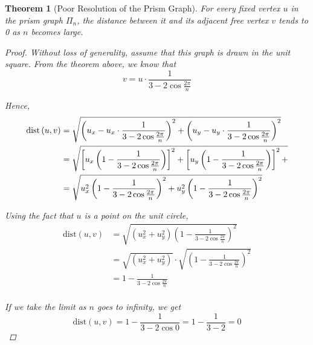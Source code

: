 \documentclass[11pt]{report}
\newcommand{\dist}[2]{\text{dist}\left({#1, #2}\right)}
\newtheorem{theorem}{Theorem}[section]
\begin{document}
\begin{theorem}[Poor Resolution of the Prism Graph]
    For every fixed vertex $u$ in the prism graph $\Pi_{n}$, the distance between it and its adjacent free vertex $v$ tends to 0 as $n$ becomes large.

    \begin{proof}
        Without loss of generality, assume that this graph is drawn in the unit square. From the theorem above, we know that
        \[ v = u \cdot \frac{1}{3 -2\cos{\frac{2\pi}{n}}} \]
        
        Hence,
        \[
        \begin{aligned}
        \dist{u}{v} &= \sqrt{
            \left(u_x - u_x \cdot \frac{1}{3 -2\cos{\frac{2\pi}{n}}}
            \right)^2 +
            \left(u_y - u_y \cdot \frac{1}{3 -2\cos{\frac{2\pi}{n}}}
            \right)^2
            } \\
            &= \sqrt{
            \left[u_x
                \left(1 - \frac{1}{3 -2\cos{\frac{2\pi}{n}}} \right)
            \right]^2 +
            \left[u_y
                \left(1 - \frac{1}{3 -2\cos{\frac{2\pi}{n}}} \right)
            \right]^2 +
            } \\
            &= \sqrt{
            u_x^2
            \left(1 - \frac{1}{3 -2\cos{\frac{2\pi}{n}}} \right)^2 +
            u_y^2
            \left(1 - \frac{1}{3 -2\cos{\frac{2\pi}{n}}} \right)^2 } \\
        \end{aligned}
        \]
        
        Using the fact that $u$ is a point on the unit circle,
        \[
        \begin{aligned}
            \dist{u}{v} &= \sqrt{
                \left( u_x^2 + u_y^2 \right)
                \left(1 - \frac{1}{3 -2\cos{\frac{2\pi}{n}}} \right)^2
            } \\
            &= \sqrt{\left( u_x^2 + u_y^2 \right)} \cdot
               \sqrt{\left(1 - \frac{1}{3 -2\cos{\frac{2\pi}{n}}} \right)^2} \\
            &= 1 - \frac{1}{3 - 2\cos{\frac{2\pi}{n}}} \\
        \end{aligned}
        \]
        
        If we take the limit as $n$ goes to infinity, we get
        \[
        \dist{u}{v} = 1 - \frac{1}{3 - 2\cos{0}} = 1 - \frac{1}{3 - 2} = 0
        \]
    \end{proof}
\end{theorem}
\end{document}
